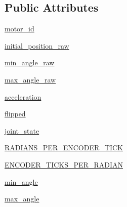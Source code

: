 \subsection*{Public Attributes}
\begin{DoxyCompactItemize}
\item 
\hyperlink{classdynamixel__controllers_1_1joint__position__controller_1_1_joint_position_controller_aeb32b28958cad0fa92972d5f4fdbb071}{motor\+\_\+id}
\item 
\hyperlink{classdynamixel__controllers_1_1joint__position__controller_1_1_joint_position_controller_ab84ae1c2a4880162b67957436895eee7}{initial\+\_\+position\+\_\+raw}
\item 
\hyperlink{classdynamixel__controllers_1_1joint__position__controller_1_1_joint_position_controller_a1844cf33ba24dfbff2df9b04745add49}{min\+\_\+angle\+\_\+raw}
\item 
\hyperlink{classdynamixel__controllers_1_1joint__position__controller_1_1_joint_position_controller_a14c7f4872d4c52eb489dcd6bd8d466bd}{max\+\_\+angle\+\_\+raw}
\item 
\hyperlink{classdynamixel__controllers_1_1joint__position__controller_1_1_joint_position_controller_a31cdb317240aeaa6139f6d27d1226515}{acceleration}
\item 
\hyperlink{classdynamixel__controllers_1_1joint__position__controller_1_1_joint_position_controller_a9b0479d196705c3461e80e36754461d6}{flipped}
\item 
\hyperlink{classdynamixel__controllers_1_1joint__position__controller_1_1_joint_position_controller_aa0c7aa327e254ce7074f638ab84cb61d}{joint\+\_\+state}
\item 
\hyperlink{classdynamixel__controllers_1_1joint__position__controller_1_1_joint_position_controller_a64a90d7d488660aab96f876cf47cfed7}{R\+A\+D\+I\+A\+N\+S\+\_\+\+P\+E\+R\+\_\+\+E\+N\+C\+O\+D\+E\+R\+\_\+\+T\+I\+CK}
\item 
\hyperlink{classdynamixel__controllers_1_1joint__position__controller_1_1_joint_position_controller_aac290583b4e3a0833ae528a6fffceb64}{E\+N\+C\+O\+D\+E\+R\+\_\+\+T\+I\+C\+K\+S\+\_\+\+P\+E\+R\+\_\+\+R\+A\+D\+I\+AN}
\item 
\hyperlink{classdynamixel__controllers_1_1joint__position__controller_1_1_joint_position_controller_ad2980c3eb7a431025fec3aab4c1a4974}{min\+\_\+angle}
\item 
\hyperlink{classdynamixel__controllers_1_1joint__position__controller_1_1_joint_position_controller_a23906978a3dada860497b0bc1b22ab70}{max\+\_\+angle}
\item 

\end{DoxyCompactItemize}
